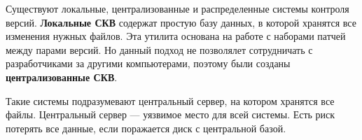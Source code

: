 \documentclass{article}
\begin{document}
Существуют локальные, централизованные и распределенные системы контроля версий.
\textbf{Локальные СКВ} содержат простую базу данных, в которой хранятся все изменения нужных файлов. Эта утилита основана на работе с наборами патчей между парами версий. Но данный подход не позволялет сотрудничать с разработчиками за другими компьютерами, поэтому были созданы \textbf{централизованные СКВ}.

\begin{figure}[h]
\end{figure}

Такие системы подразумевают центральный сервер, на котором хранятся все файлы. 
Центральный сервер — уязвимое место для всей системы. Есть риск потерять все данные, если поражается диск с центральной базой.


\begin{figure}[h]
\end{figure}
\end{document}
